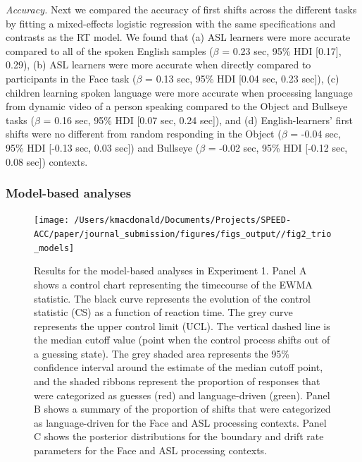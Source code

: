 \documentclass[english,floatsintext,man]{apa6}
\begin{document}
\emph{Accuracy.} Next we compared the accuracy of first shifts across
the different tasks by fitting a mixed-effects logistic regression with
the same specifications and contrasts as the RT model. We found that (a)
ASL learners were more accurate compared to all of the spoken English
samples (\(\beta\) = 0.23 sec, 95\% HDI {[}0.17{]}, 0.29), (b) ASL
learners were more accurate when directly compared to participants in
the Face task (\(\beta\) = 0.13 sec, 95\% HDI {[}0.04 sec, 0.23 sec{]}),
(c) children learning spoken language were more accurate when processing
language from dynamic video of a person speaking compared to the Object
and Bullseye tasks (\(\beta\) = 0.16 sec, 95\% HDI {[}0.07 sec, 0.24
sec{]}), and (d) English-learners' first shifts were no different from
random responding in the Object (\(\beta\) = -0.04 sec, 95\% HDI
{[}-0.13 sec, 0.03 sec{]}) and Bullseye (\(\beta\) = -0.02 sec, 95\% HDI
{[}-0.12 sec, 0.08 sec{]}) contexts.

\hypertarget{model-based-analyses}{%
\subsubsection{Model-based analyses}\label{model-based-analyses}}

\begin{figure}[!t]

{\centering \texttt{[image: /Users/kmacdonald/Documents/Projects/SPEED-ACC/paper/journal\_submission/figures/figs\_output//fig2\_trio\_models]} 

}

\caption{Results for the model-based analyses in Experiment 1. Panel A shows a control chart representing the timecourse of the EWMA statistic. The black curve represents the evolution of the control statistic (CS) as a function of reaction time. The grey curve represents the upper control limit (UCL). The vertical dashed line is the median cutoff value (point when the control process shifts out of a guessing state). The grey shaded area represents the 95\% confidence interval around the estimate of the median cutoff point, and the shaded ribbons represent the proportion of responses that were categorized as guesses (red) and language-driven (green). Panel B shows a summary of the proportion of shifts that were categorized as language-driven for the Face and ASL processing contexts. Panel C shows the posterior distributions for the boundary and drift rate parameters for the Face and ASL processing contexts.}\label{fig:trio-model-plot}
\end{figure}
\end{document}
